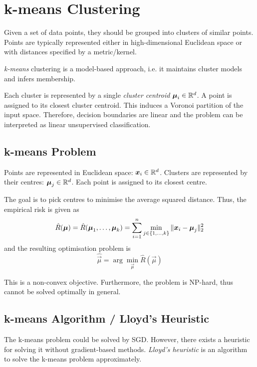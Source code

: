 \section{k-means Clustering}
Given a set of data points,
they should be grouped into clusters of similar points.
Points are typically represented either in high-dimensional
Euclidean space or with distances specified by a metric/kernel.

\emph{k-means} clustering is a model-based approach,
i.e. it maintains cluster models and infers membership.

Each cluster is represented by a single
\emph{cluster centroid} $\boldsymbol{\mu}_i \in \mathbb{R}^d$.
A point is assigned to its closest cluster centroid.
This induces a Voronoi partition of the input space.
Therefore, decision boundaries are linear and the problem
can be interpreted as linear unsupervised classification.

\subsection{k-means Problem}
Points are represented in Euclidean space:
$\boldsymbol{x}_i \in \mathbb{R}^d$.
Clusters are represented by their centres:
$\boldsymbol{\mu}_j \in \mathbb{R}^d$.
Each point is assigned to its closest centre.

The goal is to pick centres to minimise the average squared
distance. Thus, the empirical risk is given as
\begin{equation*}
    \hat{R}(\boldsymbol{\mu}) =
    \hat{R}(\boldsymbol{\mu}_1, \dotsc, \boldsymbol{\mu}_k) =
    \sum_{i=1}^n{
        \min_{
            j \in \{1, \dotsc, k\}
        }{\lVert\boldsymbol{x}_i - \boldsymbol{\mu}_j\rVert_2^2}
    }
\end{equation*}
and the resulting optimisation problem is
\begin{equation*}
    \hat{\vec{\mu}} = \arg\min_{\vec{\mu}}{\hat{R}(\vec{\mu})}
\end{equation*}

This is a non-convex objective.
Furthermore, the problem is NP-hard,
thus cannot be solved optimally in general.


\subsection{k-means Algorithm / Lloyd's Heuristic}
The k-means problem could be solved by SGD.
However, there exists a heuristic for solving it
without gradient-based methods.
\emph{Lloyd's heuristic} is an algorithm to solve the
k-means problem approximately.

